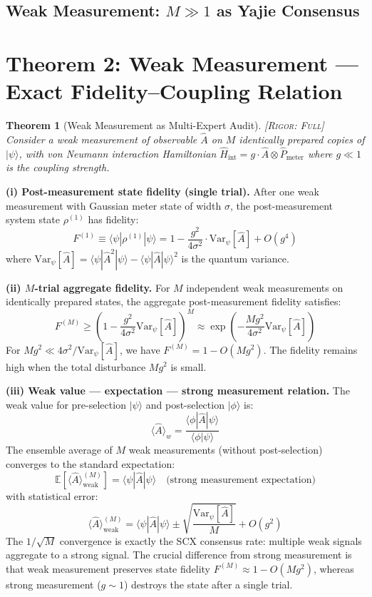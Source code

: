 \documentclass[11pt,a4paper]{article}
\newcommand{\ket}[1]{|#1\rangle}
\newcommand{\braket}[1]{\langle #1 \rangle}
\newtheorem{theorem}{Theorem}[section]
\theoremstyle{definition}
\theoremstyle{remark}
\newcommand{\E}{\mathbb{E}}
\newcommand{\brak}[1]{\langle #1 \rangle}
\newcommand{\rigorFull}{\textsc{[Rigor: Full]}}
\newcommand{\Var}{\mathrm{Var}}
\begin{document}
\subsection{Weak Measurement: $M \gg 1$ as Yajie Consensus}

\section{Theorem 2: Weak Measurement --- Exact Fidelity--Coupling Relation}

\begin{theorem}[Weak Measurement as Multi-Expert Audit]
\label{thm:weak-measurement}
\rigorFull
Consider a weak measurement of observable $\hat{A}$ on $M$ identically prepared copies of $\ket{\psi}$, with von Neumann interaction Hamiltonian $\hat{H}_{\text{int}} = g \cdot \hat{A} \otimes \hat{P}_{\text{meter}}$ where $g \ll 1$ is the coupling strength.
\end{theorem}

\medskip
\noindent\textbf{(i) Post-measurement state fidelity (single trial).}
After one weak measurement with Gaussian meter state of width $\sigma$, the post-measurement system state $\rho^{(1)}$ has fidelity:
\[
F^{(1)} \equiv \braket{\psi|\rho^{(1)}|\psi} = 1 - \frac{g^2}{4\sigma^2} \cdot \Var_{\psi}[\hat{A}] + O(g^4)
\]
where $\Var_{\psi}[\hat{A}] = \braket{\psi|\hat{A}^2|\psi} - \braket{\psi|\hat{A}|\psi}^2$ is the quantum variance.

\noindent\textbf{(ii) $M$-trial aggregate fidelity.}
For $M$ independent weak measurements on identically prepared states, the aggregate post-measurement fidelity satisfies:
\[
F^{(M)} \geq \left(1 - \frac{g^2}{4\sigma^2} \Var_{\psi}[\hat{A}]\right)^{M} \approx \exp\!\left(-\frac{M g^2}{4\sigma^2} \Var_{\psi}[\hat{A}]\right)
\]
For $M g^2 \ll 4\sigma^2 / \Var_{\psi}[\hat{A}]$, we have $F^{(M)} = 1 - O(M g^2)$. The fidelity remains high when the total disturbance $M g^2$ is small.

\noindent\textbf{(iii) Weak value --- expectation --- strong measurement relation.}
The weak value for pre-selection $\ket{\psi}$ and post-selection $\ket{\phi}$ is:
\[
\brak{\hat{A}}_w = \frac{\braket{\phi|\hat{A}|\psi}}{\braket{\phi|\psi}}
\]
The ensemble average of $M$ weak measurements (without post-selection) converges to the standard expectation:
\[
\E[\brak{\hat{A}}_{\text{weak}}^{(M)}] = \braket{\psi|\hat{A}|\psi} \quad \text{(strong measurement expectation)}
\]
with statistical error:
\[
\brak{\hat{A}}_{\text{weak}}^{(M)} = \braket{\psi|\hat{A}|\psi} \pm \sqrt{\frac{\Var_{\psi}[\hat{A}]}{M}} + O(g^2)
\]
The $1/\sqrt{M}$ convergence is exactly the SCX consensus rate: multiple weak signals aggregate to a strong signal. The crucial difference from strong measurement is that weak measurement preserves state fidelity $F^{(M)} \approx 1 - O(M g^2)$, whereas strong measurement ($g \sim 1$) destroys the state after a single trial.
\end{document}

